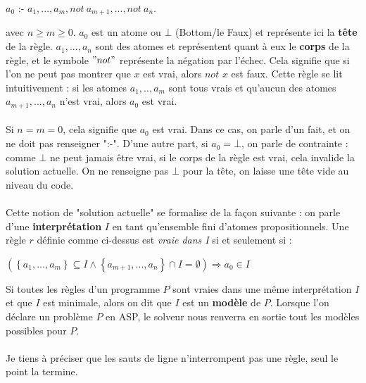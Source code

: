\documentclass[10pt,a4paper]{article}
\begin{document}
\begin{center}
$a_0$ :- $a_1,...,a_m,not \: a_{m+1},...,not \: a_n.$
\end{center}
avec $n\geq m\geq 0$. $a_0$ est un atome ou $\bot$ (Bottom/le Faux) et représente ici la \textbf{tête} de la règle. $a_1,...,a_n$ sont des atomes et représentent quant à eux le \textbf{corps} de la règle, et le symbole $"not"$ 
représente la négation par l'échec. Cela signifie que si l'on ne peut pas montrer que $x$ est vrai, alors $not$ $x$ est faux. Cette règle se lit intuitivement : si les atomes $a_1,..,a_m$ sont tous vrais et qu'aucun des atomes 
$a_{m+1},...,a_n$ n'est vrai, alors $a_0$ est vrai.\\ \\
Si $n=m=0$, cela signifie que $a_0$ est vrai. Dans ce cas, on parle d'un fait, et on ne doit pas renseigner ":-". D'une autre part, si $a_0=\bot$, on parle de contrainte : comme $\bot$ ne peut jamais être vrai, si le corps de la 
règle est vrai, cela invalide la solution actuelle. On ne renseigne pas $\bot$ pour la tête, on laisse une tête vide au niveau du code.\\ \\
Cette notion de "solution actuelle" se formalise de la façon suivante : on parle d'une \textbf{interprétation} $I$ en tant qu'ensemble fini d'atomes propositionnels. Une règle $r$ définie comme ci-dessus est \emph{vraie dans I} si 
et seulement si :

\begin{center}
$(\left\{a_1,...,a_m\right\}\subseteq I \wedge \left\{a_{m+1},...,a_n\right\} \cap I = \emptyset) \Rightarrow a_0 \in I$\\
\end{center}
Si toutes les règles d'un programme $P$ sont vraies dans une même interprétation $I$ et que $I$ est minimale, alors on dit que $I$ est un \textbf{modèle} de $P$. Lorsque l'on déclare un problème $P$ en ASP, le solveur nous renverra 
en sortie tout les modèles possibles pour $P$.\\ \\
Je tiens à préciser que les sauts de ligne n'interrompent pas une règle, seul le point la termine.
\end{document}
